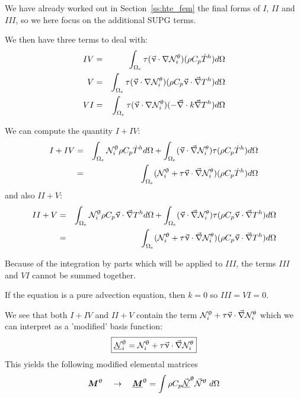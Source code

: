 We have already worked out in Section~\ref{ss:hte_fem} the final forms of $I$, $II$ and 
$III$, so we here focus on the additional SUPG terms. 
  
We then have three terms to deal with:
\begin{eqnarray}
IV &=&\int_{\Omega_e} \tau(\vec\upnu\cdot\nabla {\mathcal{N}}_i^\theta) (\rho C_p\dot{T}^h)  d\Omega \\
V  &=&\int_{\Omega_e} \tau(\vec\upnu\cdot\nabla {\mathcal{N}}_i^\theta)(\rho C_p{\vec \upnu}\cdot{\vec\nabla T^h}) d\Omega \\
VI &=&\int_{\Omega_e} \tau(\vec\upnu\cdot\nabla {\mathcal{N}}_i^\theta)(-{\vec \nabla} \cdot k \vec\nabla T^h ) d\Omega 
\end{eqnarray}

We can compute the quantity $I+IV$:
\begin{eqnarray}
I+IV 
&=&
\int_{\Omega_e} {\mathcal{N}}^\uptheta_i  \rho C_p \dot{T}^h d\Omega 
+
\int_{\Omega_e}(\vec\upnu\cdot\vec\nabla {\mathcal{N}}_i^\theta)  \tau ( \rho C_p\dot{T}^h)  d\Omega \nonumber\\
&=& 
\int_{\Omega_e} ( {\mathcal{N}}^\uptheta_i + \tau \vec\upnu\cdot\vec\nabla {\mathcal{N}}_i^\theta )  ( \rho C_p\dot{T}^h)  d\Omega 
\end{eqnarray}
and also $II+V$:
\begin{eqnarray}
II+V 
&=&
\int_{\Omega_e} {\mathcal{N}}^\uptheta_i  \rho C_p  {\vec \upnu}\cdot {\vec\nabla T^h}   d\Omega
+
\int_{\Omega_e}(\vec\upnu\cdot\vec\nabla {\mathcal{N}}_i^\theta) \tau (\rho C_p {\vec \upnu}\cdot{\vec\nabla T^h}) d\Omega \\
&=& 
\int_{\Omega_e} ({\mathcal{N}}^\uptheta_i  + \tau \vec\upnu\cdot\vec\nabla {\mathcal{N}}_i^\theta) (\rho C_p {\vec \upnu}\cdot{\vec\nabla T^h}) d\Omega 
\end{eqnarray}

\begin{remark} Because of the integration by parts which 
will be applied to  $III$, the terms $III$ and $VI$ cannot be summed together.
\end{remark}


\begin{remark}
If the equation is a pure advection equation, then $k=0$ so $III=VI=0$. 
\end{remark}


We see that both $I+IV$ and $II+V$ contain the term ${\mathcal{N}}^\uptheta_i  + \tau \vec\upnu\cdot\vec\nabla {\mathcal{N}}_i^\theta$
which we can interpret as a 'modified' basis function:
\[
\boxed{
\underline{{\mathcal{N}}}^\uptheta_i = {\mathcal{N}}^\uptheta_i  + \tau \vec\upnu\cdot\vec\nabla {\mathcal{N}}_i^\theta
}
\]
This yields the following modified elemental matrices
\[
{\bm M}^\uptheta \quad \rightarrow \quad \underline{\bm M}^\uptheta
= \int \rho C_p \vec{\underline{{\mathcal{N}}}}^\uptheta \vec{{\mathcal{N}}}^\uptheta \; d\Omega
\]

